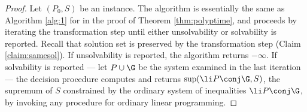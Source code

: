 \begin{proof}
Let $(P_0, S)$ be an instance.
The algorithm is essentially the same as Algorithm \ref{alg:1} for \allpolyineqsolvname 
in the proof of Theorem \ref{thm:polyptime}, and proceeds
by iterating the transformation step until either unsolvability or solvability is reported.
Recall that solution set is preserved by the transformation step (Claim \ref{claim:samesol}).
If unsolvability is reported, the algorithm returns $-\infty$.
If solvability is reported --- let $P\cup \G$ be the system examined in the last iteration
---
the decision procedure computes and returns $\sup (\li P \conj \G, S)$, 
the supremum of $S$ constrained by the ordinary system of inequalities $\li  P \conj \G$,
by invoking any \PTIME procedure for ordinary linear programming.


\end{proof}
